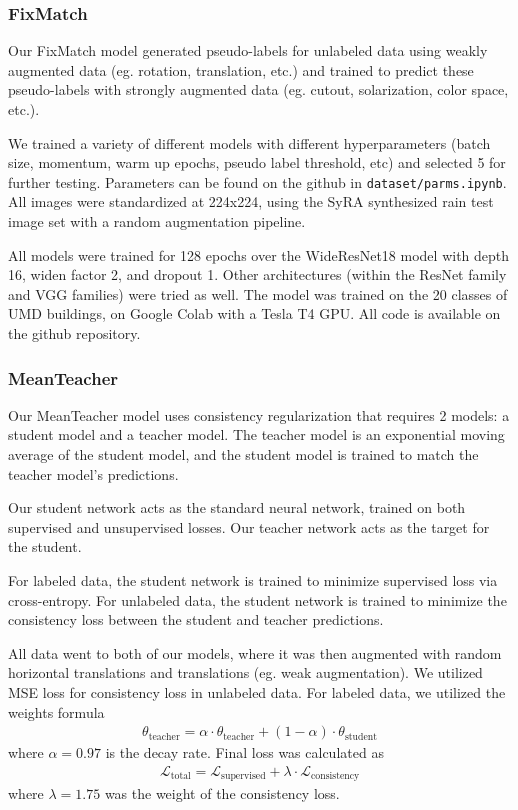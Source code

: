 \documentclass{article}
\begin{document}
\subsubsection{FixMatch}

Our FixMatch model generated pseudo-labels for unlabeled data using weakly augmented data (eg. rotation, translation, etc.) and trained to predict these pseudo-labels with strongly augmented data (eg. cutout, solarization, color space, etc.).

We trained a variety of different models with different hyperparameters (batch size, momentum, warm up epochs, pseudo label threshold, etc) and selected 5 for further testing. Parameters can be found on the github in \verb*|dataset/parms.ipynb|. All images were standardized at 224x224, using the SyRA synthesized rain test image set with a random augmentation pipeline. 

All models were trained for 128 epochs over the WideResNet18 model with depth 16, widen factor 2, and dropout 1. Other architectures (within the ResNet family and VGG families) were tried as well. The model was trained on the 20 classes of UMD buildings, on Google Colab with a Tesla T4 GPU. All code is available on the github repository.

\subsubsection{MeanTeacher}

Our MeanTeacher model uses consistency regularization that requires 2 models: a student model and a teacher model. The teacher model is an exponential moving average of the student model, and the student model is trained to match the teacher model’s predictions.

Our student network acts as the standard neural network, trained on both supervised and unsupervised losses. Our teacher network acts as the target for the student. 

For labeled data, the student network is trained to minimize supervised loss via cross-entropy. For unlabeled data, the student network is trained to minimize the consistency loss between the student and teacher predictions.

All data went to both of our models, where it was then augmented with random horizontal translations and translations (eg. weak augmentation). We utilized MSE loss for consistency loss in unlabeled data. For labeled data, we utilized the weights formula \begin{align*}
    \theta_{\text{teacher}}=\alpha \cdot\theta_{\text{teacher}}+(1-\alpha)\cdot\theta_{\text{student}}
\end{align*} where $\alpha=0.97$ is the decay rate. Final loss was calculated as \begin{align*}
    \mathcal{L}_{\text{total}}=\mathcal{L}_{\text{supervised}}+\lambda\cdot\mathcal{L}_{\text{consistency}}
\end{align*}where $\lambda=1.75$ was the weight of the consistency loss.
\end{document}
